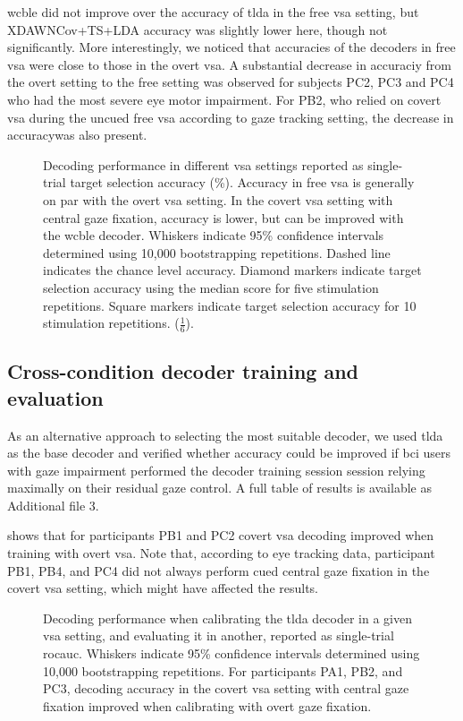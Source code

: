 \documentclass{article}
\begin{document}
\Ac{wcble} did not improve over the accuracy of \ac{tlda} in the free \ac{vsa} setting, but
XDAWNCov+TS+LDA accuracy was slightly lower here, though not
significantly.
More interestingly, we noticed that accuracies of the decoders in free
\ac{vsa} were close to those in the overt \ac{vsa}.
A substantial decrease in accuraciy from the overt setting to the free
setting was observed for subjects PC2, PC3 and PC4 who had the most severe eye
motor impairment.
For PB2, who relied on covert \ac{vsa} during the uncued free \ac{vsa}
according to gaze tracking setting, the decrease in accuracywas also
present.
\begin{figure}
	
	\caption{%
		Decoding performance in different \ac{vsa} settings reported as
		single-trial target selection accuracy (\%).
		Accuracy in free \ac{vsa} is generally on par with the overt \ac{vsa}
		setting.
		In the covert \ac{vsa} setting with central gaze fixation, accuracy is lower, but can
		be improved with the \ac{wcble} decoder.
		Whiskers indicate 95\% confidence intervals determined using 10,000 bootstrapping
		repetitions. Dashed line indicates the chance level accuracy. Diamond
		markers indicate target selection accuracy using the median score for five stimulation
		repetitions. Square markers indicate target selection accuracy for 10
		stimulation repetitions.
		($\frac{1}{6}$).
	}%
	\label{fig:patients/decode}
\end{figure}

\subsection{Cross-condition decoder training and evaluation}%
\label{sec:patients/outcomes/cross}

As an alternative approach to selecting the most suitable decoder, we used
\ac{tlda} as the base decoder and verified whether accuracy could be improved
if \ac{bci} users with gaze impairment performed the decoder training session
session relying maximally on their residual gaze control.
A full table of results is available as Additional file 3.

 shows that for participants PB1 and PC2 covert \ac{vsa} decoding
improved when training with overt \ac{vsa}.
Note that, according to eye tracking data, participant PB1, PB4, and PC4 did not
always perform cued central gaze fixation in the covert \ac{vsa} setting,
which might have affected the results.
\begin{figure}
	
	\caption{%
		Decoding performance when calibrating the \ac{tlda} decoder in a given \ac{vsa}
		setting, and evaluating it in another, reported as
		single-trial \ac{rocauc}.
		Whiskers indicate 95\% confidence intervals determined using 10,000 bootstrapping
		repetitions.
		For participants PA1, PB2, and PC3, decoding accuracy in the covert \ac{vsa} setting with central gaze fixation
		improved when calibrating with overt gaze fixation.
	}%
	\label{fig:patients/cross}
\end{figure}
\end{document}

